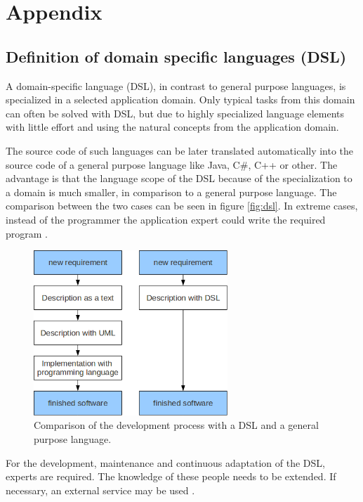 \appendix
\chapter{Appendix}
\section{Definition of domain specific languages (DSL)}
\par
A domain-specific language (DSL), in contrast to general purpose languages, is specialized in a selected application domain. Only typical tasks from this domain can often be solved with DSL, but due to highly specialized language elements with little effort and using the natural concepts from the application domain.
\par
The source code of such languages can be later translated automatically into the source code of a general purpose language like Java, C\#, C++ or other. The advantage is that the language scope of the DSL because of the specialization to a domain is much smaller, in comparison to a general purpose language. The comparison between the two cases can be seen in figure \vref{fig:dsl}. In extreme cases, instead of the programmer the application expert could write the required program \autocite{appendix:dsl}.
\begin{figure}[htbp]
	\centering
	\includegraphics[width=0.65\textwidth]{pics/appendix/dsl.png}
	\caption{Comparison of the development process with a DSL and a general purpose language.  \label{fig:dsl}}	
\end{figure}
\par
For the development, maintenance and continuous adaptation of the DSL, experts are required. The knowledge of these people needs to be extended. If necessary, an external service may be used \autocite{appendix:dsl}. 


